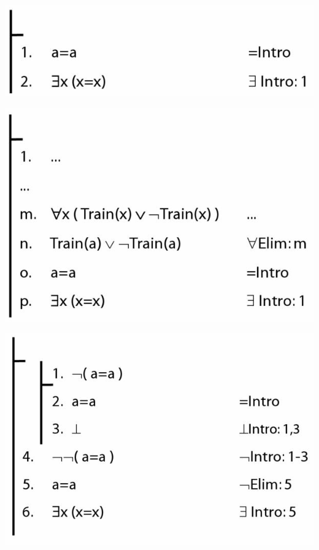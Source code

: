 \documentclass[12pt]{extarticle}
\begin{document}
\begin{multicols*}{3}
\begin{center}
\includegraphics[scale=0.3]{img/uni_805_proof1.png}
\end{center}
\begin{center}
\includegraphics[scale=0.3]{img/uni_805_proof2.png}
\end{center}
\begin{center}
\includegraphics[scale=0.3]{img/uni_805_proof3.png}
\end{center}
 

\end{multicols*}
\end{document}

